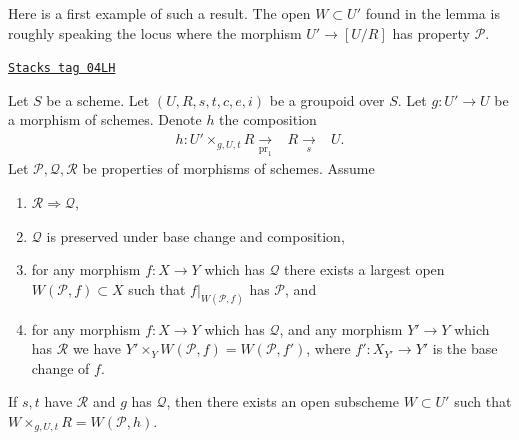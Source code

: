 \medskip\noindent
Here is a first example of such a result. The open $W \subset U'$ found
in the lemma is roughly speaking the locus where the morphism
$U' \to [U/R]$ has property $\mathcal{P}$.

\begin{lemma}
\label{more-groupoids-lemma-local-source}
\href{https://stacks.math.columbia.edu/tag/04LH}{\texttt{Stacks tag 04LH}}

Let $S$ be a scheme.
Let $(U, R, s, t, c, e, i)$ be a groupoid over $S$.
Let $g : U' \to U$ be a morphism of schemes.
Denote $h$ the composition
$$
\begin{array}{ccc}h : U' \times_{g, U, t} R \underset{\text{pr}_1}{\longrightarrow} & R \underset{s}{\longrightarrow} & U.\end{array}
$$
Let $\mathcal{P}, \mathcal{Q}, \mathcal{R}$ be properties of morphisms
of schemes. Assume
\begin{enumerate}
\item $\mathcal{R} \Rightarrow \mathcal{Q}$,
\item $\mathcal{Q}$ is preserved under base change and composition,
\item for any morphism $f : X \to Y$ which has $\mathcal{Q}$ there exists a
largest open $W(\mathcal{P}, f) \subset X$ such that $f|_{W(\mathcal{P}, f)}$
has $\mathcal{P}$, and
\item for any morphism $f : X \to Y$ which has $\mathcal{Q}$,
and any morphism $Y' \to Y$ which has $\mathcal{R}$ we have
$Y' \times_Y W(\mathcal{P}, f) = W(\mathcal{P}, f')$, where
$f' : X_{Y'} \to Y'$ is the base change of $f$.
\end{enumerate}
If $s, t$ have $\mathcal{R}$ and $g$ has $\mathcal{Q}$, then
there exists an open subscheme $W \subset U'$ such that
$W \times_{g, U, t} R = W(\mathcal{P}, h)$.
\end{lemma}

